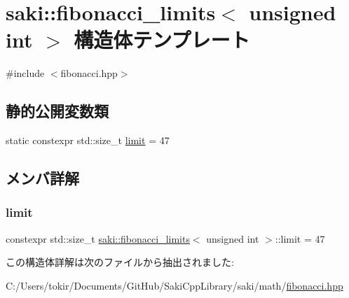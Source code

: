 \hypertarget{structsaki_1_1fibonacci__limits_3_01unsigned_01int_01_4}{}\section{saki\+:\+:fibonacci\+\_\+limits$<$ unsigned int $>$ 構造体テンプレート}
\label{structsaki_1_1fibonacci__limits_3_01unsigned_01int_01_4}


{\ttfamily \#include $<$fibonacci.\+hpp$>$}

\subsection*{静的公開変数類}
\begin{DoxyCompactItemize}
\item 
static constexpr std\+::size\+\_\+t \mbox{\hyperlink{structsaki_1_1fibonacci__limits_3_01unsigned_01int_01_4_ace5fde0eb7a274d824bcd82963f30d01}{limit}} = 47
\end{DoxyCompactItemize}


\subsection{メンバ詳解}
\mbox{\label{structsaki_1_1fibonacci__limits_3_01unsigned_01int_01_4_ace5fde0eb7a274d824bcd82963f30d01}} 
\subsubsection{\texorpdfstring{limit}{limit}}
{\footnotesize\ttfamily constexpr std\+::size\+\_\+t \mbox{\hyperlink{structsaki_1_1fibonacci__limits}{saki\+::fibonacci\+\_\+limits}}$<$ unsigned int $>$\+::limit = 47\hspace{0.3cm}{\ttfamily [static]}}



この構造体詳解は次のファイルから抽出されました\+:\begin{DoxyCompactItemize}
\item 
C\+:/\+Users/tokir/\+Documents/\+Git\+Hub/\+Saki\+Cpp\+Library/saki/math/\mbox{\hyperlink{fibonacci_8hpp}{fibonacci.\+hpp}}\end{DoxyCompactItemize}

